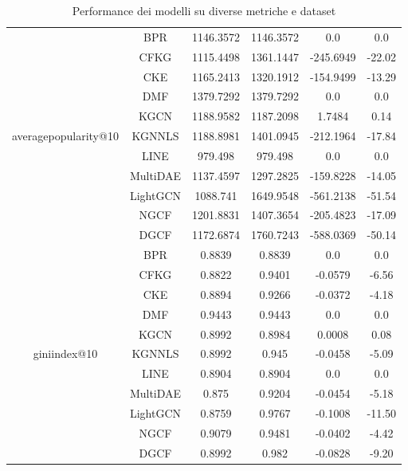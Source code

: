 \begin{table}[H]
{\begin{tabular}{|c|c|c|c|c|c|}
            \multirow{11}{*}{averagepopularity@10} 
                & BPR & 1146.3572 & 1146.3572 & 0.0 & 0.0 \\ \cline{2-6} 
                & CFKG & 1115.4498 & 1361.1447 & -245.6949 & -22.02 \\ \cline{2-6} 
                & CKE & 1165.2413 & 1320.1912 & -154.9499 & -13.29 \\ \cline{2-6} 
                & DMF & 1379.7292 & 1379.7292 & 0.0 & 0.0 \\ \cline{2-6} 
                & KGCN & 1188.9582 & 1187.2098 & 1.7484 & 0.14 \\ \cline{2-6} 
                & KGNNLS & 1188.8981 & 1401.0945 & -212.1964 & -17.84 \\ \cline{2-6} 
                & LINE & 979.498 & 979.498 & 0.0 & 0.0 \\ \cline{2-6} 
                & MultiDAE & 1137.4597 & 1297.2825 & -159.8228 & -14.05 \\ \cline{2-6} 
                & LightGCN & 1088.741 & 1649.9548 & -561.2138 & -51.54 \\ \cline{2-6} 
                & NGCF & 1201.8831 & 1407.3654 & -205.4823 & -17.09 \\ \cline{2-6} 
                & DGCF & 1172.6874 & 1760.7243 & -588.0369 & -50.14 \\ \hline

            \multirow{11}{*}{giniindex@10} 
                & BPR & 0.8839 & 0.8839 & 0.0 & 0.0 \\ \cline{2-6} 
                & CFKG & 0.8822 & 0.9401 & -0.0579 & -6.56 \\ \cline{2-6} 
                & CKE & 0.8894 & 0.9266 & -0.0372 & -4.18 \\ \cline{2-6} 
                & DMF & 0.9443 & 0.9443 & 0.0 & 0.0 \\ \cline{2-6} 
                & KGCN & 0.8992 & 0.8984 & 0.0008 & 0.08 \\ \cline{2-6} 
                & KGNNLS & 0.8992 & 0.945 & -0.0458 & -5.09 \\ \cline{2-6} 
                & LINE & 0.8904 & 0.8904 & 0.0 & 0.0 \\ \cline{2-6} 
                & MultiDAE & 0.875 & 0.9204 & -0.0454 & -5.18 \\ \cline{2-6} 
                & LightGCN & 0.8759 & 0.9767 & -0.1008 & -11.50 \\ \cline{2-6} 
                & NGCF & 0.9079 & 0.9481 & -0.0402 & -4.42 \\ \cline{2-6} 
                & DGCF & 0.8992 & 0.982 & -0.0828 & -9.20 \\ \hline
        \end{tabular}
    }
    \caption{Performance dei modelli su diverse metriche e dataset}
\end{table}



